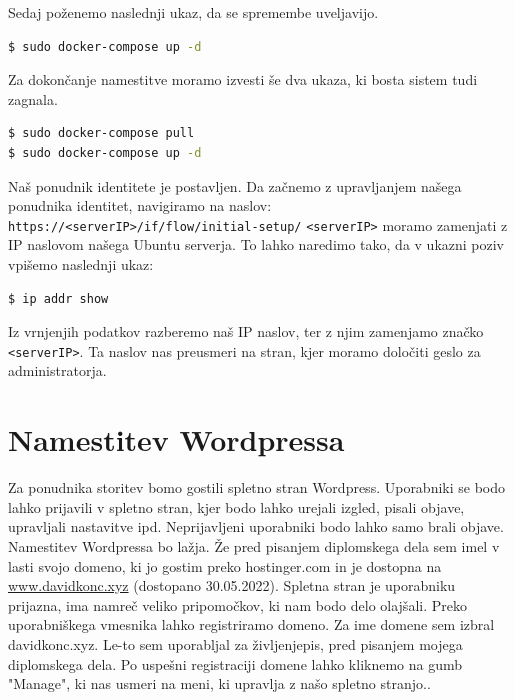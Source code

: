 \documentclass[a4paper,12pt,openright]{book}
\begin{document}
Sedaj poženemo naslednji ukaz, da se spremembe uveljavijo. 

\begin{lstlisting}[language=bash]
$ sudo docker-compose up -d
\end{lstlisting}

Za dokončanje namestitve moramo izvesti še dva ukaza, ki bosta sistem tudi zagnala.

\begin{lstlisting}[language=bash]
$ sudo docker-compose pull
$ sudo docker-compose up -d
\end{lstlisting}

Naš ponudnik identitete je postavljen. Da začnemo z upravljanjem našega ponudnika identitet, navigiramo na naslov: 
\newline
\texttt{https://<serverIP>/if/flow/initial-setup/} 
\newline
\texttt{<serverIP>} moramo zamenjati z IP naslovom našega Ubuntu serverja. To lahko naredimo tako, da v ukazni poziv vpišemo naslednji ukaz:
\begin{lstlisting}[language=bash]
 $ ip addr show
\end{lstlisting}

Iz vrnjenjih podatkov razberemo naš IP naslov, ter z njim zamenjamo značko \texttt{<serverIP>}. Ta naslov nas preusmeri na stran, kjer moramo določiti geslo za administratorja. 

\section{Namestitev Wordpressa}
Za ponudnika storitev bomo gostili spletno stran Wordpress. Uporabniki se bodo lahko prijavili v spletno stran, kjer bodo lahko urejali izgled, pisali objave, upravljali nastavitve ipd. 
Neprijavljeni uporabniki bodo lahko samo brali objave. 
\newline
Namestitev Wordpressa bo lažja. Že pred pisanjem diplomskega dela sem imel v lasti svojo domeno, ki jo gostim preko hostinger.com in je dostopna na \href{www.davidkonc.xyz}{www.davidkonc.xyz} (dostopano 30.05.2022). 
Spletna stran je uporabniku prijazna, ima namreč veliko pripomočkov, ki nam bodo delo olajšali.
Preko uporabniškega vmesnika lahko registriramo domeno. Za ime domene sem izbral davidkonc.xyz. Le-to sem uporabljal za življenjepis, pred pisanjem mojega diplomskega dela. 
Po uspešni registraciji domene lahko kliknemo na gumb "Manage", ki nas usmeri na meni, ki upravlja z našo spletno stranjo..
\end{document}

